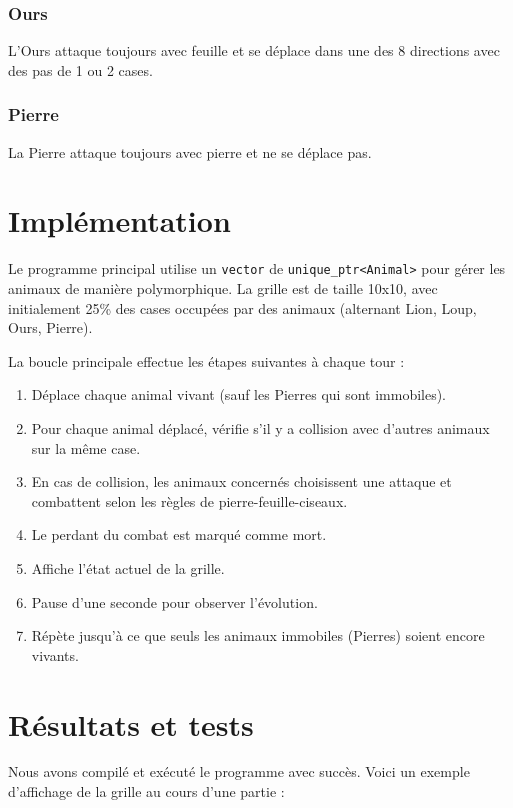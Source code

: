 \documentclass[a4paper,12pt,french]{article}
\begin{document}
\subsubsection{Ours}

L'Ours attaque toujours avec feuille et se déplace dans une des 8 directions avec des pas de 1 ou 2 cases.

\subsubsection{Pierre}

La Pierre attaque toujours avec pierre et ne se déplace pas.

\section{Implémentation}

Le programme principal utilise un \texttt{vector} de \texttt{unique\_ptr<Animal>} pour gérer les animaux de manière polymorphique. La grille est de taille 10x10, avec initialement 25\% des cases occupées par des animaux (alternant Lion, Loup, Ours, Pierre).

La boucle principale effectue les étapes suivantes à chaque tour :
\begin{enumerate}
  \item Déplace chaque animal vivant (sauf les Pierres qui sont immobiles).
  \item Pour chaque animal déplacé, vérifie s'il y a collision avec d'autres animaux sur la même case.
  \item En cas de collision, les animaux concernés choisissent une attaque et combattent selon les règles de pierre-feuille-ciseaux.
  \item Le perdant du combat est marqué comme mort.
  \item Affiche l'état actuel de la grille.
  \item Pause d'une seconde pour observer l'évolution.
  \item Répète jusqu'à ce que seuls les animaux immobiles (Pierres) soient encore vivants.
\end{enumerate}

\section{Résultats et tests}

Nous avons compilé et exécuté le programme avec succès. Voici un exemple d'affichage de la grille au cours d'une partie :
\end{document}
